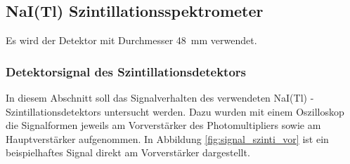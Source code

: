 \documentclass[11pt, a4paper]{article}
\numberwithin{equation}{section}
\begin{document}
\subsection{NaI(Tl) Szintillationsspektrometer}
Es wird der Detektor mit Durchmesser \SI{48}{mm} verwendet.


\subsubsection{Detektorsignal des Szintillationsdetektors}
\label{sec:detektorsignal_szinti}
In diesem Abschnitt soll das Signalverhalten des verwendeten NaI(Tl) - Szintillationsdetektors untersucht werden.
Dazu wurden mit einem Oszilloskop die Signalformen jeweils am Vorverstärker des Photomultipliers sowie am Hauptverstärker aufgenommen.
In Abbildung \ref{fig:signal_szinti_vor} ist ein beispielhaftes Signal direkt am Vorverstärker dargestellt.
\end{document}
